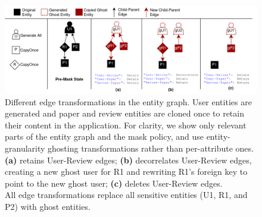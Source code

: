 \begin{figure}[t!]
    \centering
    \includegraphics[width=\textwidth]{img/edge_transforms}

    \caption{Different edge transformations in the entity graph. User entities are generated and
    paper and review entities are cloned once to retain their content in the application. 
    For clarity, we show only relevant parts of the entity graph and the mask policy, and use entity-granularity ghosting
        transformations rather than per-attribute ones.\\
    \textbf{(a)} retains User-Review edges;
    \textbf{(b)} decorrelates User-Review edges, creating a new ghost user for R1 and rewriting R1's 
    foreign key to point to the new ghost user;
    \textbf{(c)} deletes User-Review edges.\\
    All edge transformations replace all sensitive entities (U1, R1, and P2) with ghost entities.
    }
    \label{fig:edgepol}
\end{figure}

